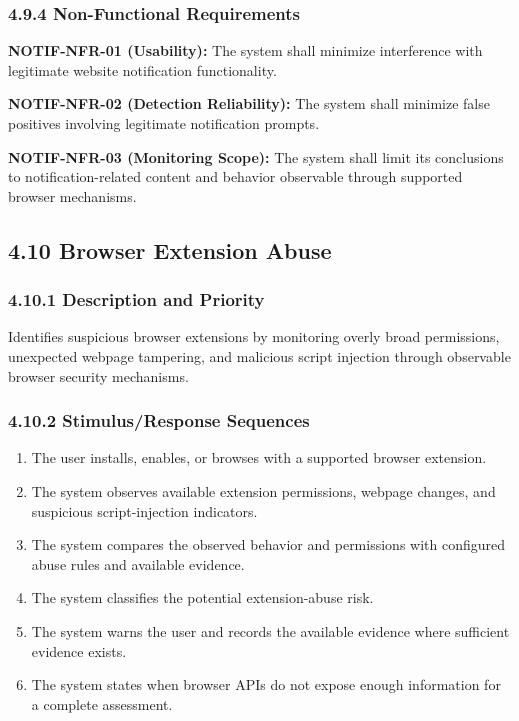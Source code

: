 \documentclass[12pt,a4paper]{report}
\let\originaladdcontentsline\addcontentsline
\renewcommand{\addcontentsline}[3]{\phantomsection\originaladdcontentsline{#1}{#2}{#3}}
\begin{document}
\subsubsection*{4.9.4 Non-Functional Requirements}

\textbf{NOTIF-NFR-01 (Usability):} The system shall minimize interference with legitimate website notification functionality.\par

\textbf{NOTIF-NFR-02 (Detection Reliability):} The system shall minimize false positives involving legitimate notification prompts.\par

\textbf{NOTIF-NFR-03 (Monitoring Scope):} The system shall limit its conclusions to notification-related content and behavior observable through supported browser mechanisms.\par

\subsection*{4.10 Browser Extension Abuse}

\subsubsection*{4.10.1 Description and Priority}

Identifies suspicious browser extensions by monitoring overly broad permissions, unexpected webpage tampering, and malicious script injection through observable browser security mechanisms.\par

\subsubsection*{4.10.2 Stimulus/Response Sequences}

\begin{enumerate}
\item The user installs, enables, or browses with a supported browser extension.
\item The system observes available extension permissions, webpage changes, and suspicious script-injection indicators.
\item The system compares the observed behavior and permissions with configured abuse rules and available evidence.
\item The system classifies the potential extension-abuse risk.
\item The system warns the user and records the available evidence where sufficient evidence exists.
\item The system states when browser APIs do not expose enough information for a complete assessment.
\end{enumerate}
\end{document}
